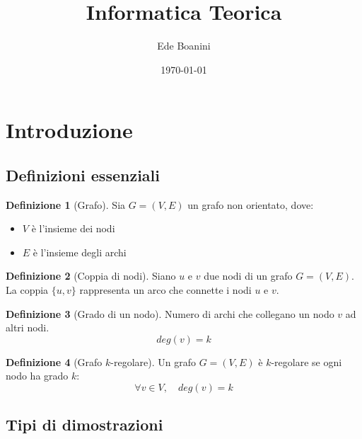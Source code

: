 \documentclass{article}  %
\title{Informatica Teorica}
\author{Ede Boanini}
\date{\today}
\theoremstyle{definition}
\newtheorem{definition}{Definizione}[section]
\begin{document}
\tableofcontents
\newpage %
\maketitle
\section{Introduzione}
\subsection{Definizioni essenziali}
\begin{definition}[Grafo]
Sia \(G=(V,E)\) un grafo non orientato, dove:
\begin{itemize}
  \item \(V\) è l'insieme dei nodi
  \item \(E\) è l'insieme degli archi
\end{itemize}
\end{definition}
\begin{definition}[Coppia di nodi]
Siano \(u\) e \(v\) due nodi di un grafo \(G = (V,E)\). 
La coppia \(\{u,v\}\) rappresenta un arco che connette i nodi \(u\) e \(v\). 
\end{definition}
\begin{definition}[Grado di un nodo]
Numero di archi che collegano un nodo $v$ ad altri nodi.
\[
deg(v)=k
\]
\end{definition}
\begin{definition}[Grafo $k$-regolare]
Un grafo \(G=(V,E)\) è $k$-regolare se ogni nodo ha grado $k$:
\[
\forall v \in V, \quad deg(v)=k
\]
\end{definition}
\subsection{Tipi di dimostrazioni}
\end{document}

